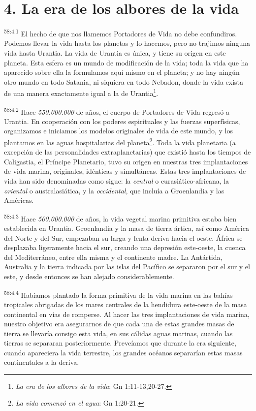 \section*{4. La era de los albores de la vida}
\par
\textsuperscript{58:4.1} El hecho de que nos llamemos Portadores de Vida no debe confundiros. Podemos llevar la vida hasta los planetas y lo hacemos, pero no trajimos ninguna vida hasta Urantia. La vida de Urantia es única, y tiene su origen en este planeta. Esta esfera es un mundo de modificación de la vida; toda la vida que ha aparecido sobre ella la formulamos aquí mismo en el planeta; y no hay ningún otro mundo en todo Satania, ni siquiera en todo Nebadon, donde la vida exista de una manera exactamente igual a la de Urantia\footnote{\textit{La era de los albores de la vida}: Gn 1:11-13,20-27.}.

\par
\textsuperscript{58:4.2} Hace \textit{550.000.000} de años, el cuerpo de Portadores de Vida regresó a Urantia. En cooperación con los poderes espirituales y las fuerzas superfísicas, organizamos e iniciamos los modelos originales de vida de este mundo, y los plantamos en las aguas hospitalarias del planeta\footnote{\textit{La vida comenzó en el agua}: Gn 1:20-21.}. Toda la vida planetaria (a excepción de las personalidades extraplanetarias) que existió hasta los tiempos de Caligastia, el Príncipe Planetario, tuvo su origen en nuestras tres implantaciones de vida marina, originales, idénticas y simultáneas. Estas tres implantaciones de vida han sido denominadas como sigue: la \textit{central} o eurasiático-africana, la \textit{oriental} o australasiática, y la \textit{occidental}, que incluía a Groenlandia y las Américas.

\par
\textsuperscript{58:4.3} Hace \textit{500.000.000} de años, la vida vegetal marina primitiva estaba bien establecida en Urantia. Groenlandia y la masa de tierra ártica, así como América del Norte y del Sur, empezaban su larga y lenta deriva hacia el oeste. África se desplazaba ligeramente hacia el sur, creando una depresión este-oeste, la cuenca del Mediterráneo, entre ella misma y el continente madre. La Antártida, Australia y la tierra indicada por las islas del Pacífico se separaron por el sur y el este, y desde entonces se han alejado considerablemente.

\par
\textsuperscript{58:4.4} Habíamos plantado la forma primitiva de la vida marina en las bahías tropicales abrigadas de los mares centrales de la hendidura este-oeste de la masa continental en vías de romperse. Al hacer las tres implantaciones de vida marina, nuestro objetivo era asegurarnos de que cada una de estas grandes masas de tierra se llevaría consigo esta vida, en sus cálidas aguas marinas, cuando las tierras se separaran posteriormente. Preveíamos que durante la era siguiente, cuando apareciera la vida terrestre, los grandes océanos separarían estas masas continentales a la deriva.

